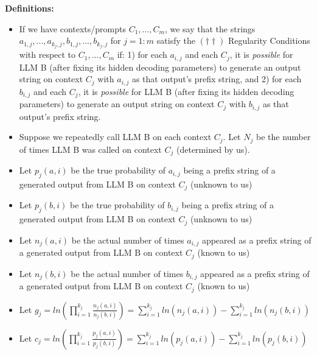 \documentclass{article}
\begin{document}
\textbf{Definitions:}
\begin{itemize}
\item If we have contexts/prompts $\displaystyle C_{1} ,...,C_{m}$, we say that the strings $\displaystyle a_{1,j} ,...,a_{k_{j} ,j} ,b_{1,j} ,...,b_{k_{j} ,j}$ for $\displaystyle j=1:m$ satisfy the $\displaystyle \left( \dagger \dagger \right)$ Regularity Conditions with respect to $\displaystyle C_{1} ,...,C_{m}$ if: 1) for each $\displaystyle a_{i,j}$ and each $\displaystyle C_{j}$, it is \textit{possible} for LLM B (after fixing its hidden decoding parameters) to generate an output string on context $\displaystyle C_{j}$ with $\displaystyle a_{i,j}$ as that output's prefix string, and 2) for each $\displaystyle b_{i,j}$ and each $\displaystyle C_{j}$, it is \textit{possible} for LLM B (after fixing its hidden decoding parameters) to generate an output string on context $\displaystyle C_{j}$ with $\displaystyle b_{i,j}$ as that output's prefix string.
\item Suppose we repeatedly call LLM B on each context $\displaystyle C_{j}$. Let $\displaystyle N_{j}$ be the number of times LLM B was called on context $\displaystyle C_{j}$ (determined by us).
\item Let $\displaystyle p_{j}\left( a,i\right)$ be the true probability of $\displaystyle a_{i,j}$ being a prefix string of a generated output from LLM B on context $\displaystyle C_{j}$ (unknown to us)
\item Let $\displaystyle p_{j}\left( b,i\right)$ be the true probability of $\displaystyle b_{i,j}$ being a prefix string of a generated output from LLM B on context $\displaystyle C_{j}$ (unknown to us)
\item Let $\displaystyle n_{j}\left( a,i\right)$ be the actual number of times $\displaystyle a_{i,j}$ appeared as a prefix string of a generated output from LLM B on context $\displaystyle C_{j}$ (known to us)
\item Let $\displaystyle n_{j}\left( b,i\right)$ be the actual number of times $\displaystyle b_{i,j}$ appeared as a prefix string of a generated output from LLM B on context $\displaystyle C_{j}$ (known to us)
\item Let $\displaystyle g_{j} =ln\left(\prod _{i=1}^{k_{j}}\frac{n_{j}\left( a,i\right)}{n_{j}\left( b,i\right)}\right) =\sum _{i=1}^{k_{j}} ln\left( n_{j}\left( a,i\right)\right) -\sum _{i=1}^{k_{j}} ln\left( n_{j}\left( b,i\right)\right)$
\item Let $\displaystyle c_{j} =ln\left(\prod _{i=1}^{k_{j}}\frac{p_{j}\left( a,i\right)}{p_{j}\left( b,i\right)}\right) =\sum _{i=1}^{k_{j}} ln\left( p_{j}\left( a,i\right)\right) -\sum _{i=1}^{k_{j}} ln\left( p_{j}\left( b,i\right)\right)$
\end{itemize}
\end{document}
